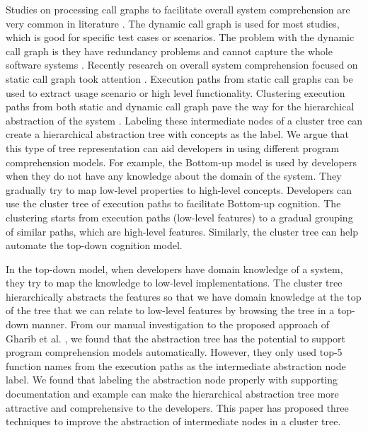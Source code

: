Studies on processing call graphs to facilitate overall system comprehension are very common in literature \cite{cornelissen2007understandingMassiveSequence, feng2018hierarchicalExecutionComprehension, reiss2005dynamicSoftwarePhases, watanabe2008featurePhaseDetection} . The dynamic call graph is used for most studies, which is good for specific test cases or scenarios. The problem with the dynamic call graph is they have redundancy problems and cannot capture the whole software systems \cite{gharibi2018automaticStaticCluster}. Recently research on overall system comprehension focused on static call graph took attention \cite{gharibi2018automaticStaticCluster, walunj2019graphevoEvolutionCall}. Execution paths from static call graphs \cite{pradel2009automaticUseageSpecification, salah2005scenariographerReverseEngineering} can be used to extract usage scenario or high level functionality. Clustering execution paths from both static and dynamic call graph pave the way for the hierarchical abstraction of the system \cite{feng2018hierarchicalExecutionComprehension, gharibi2018automaticStaticCluster}. Labeling these intermediate nodes of a cluster tree can create a hierarchical abstraction tree with concepts as the label. We argue that this type of tree representation can aid developers in using different program comprehension models. For example, the Bottom-up model is used by developers when they do not have any knowledge about the domain of the system. They gradually try to map low-level properties to high-level concepts. Developers can use the cluster tree of execution paths to facilitate Bottom-up cognition. The clustering starts from execution paths (low-level features) to a gradual grouping of similar paths, which are high-level features. Similarly, the cluster tree can help automate the top-down cognition model. 

In the top-down model, when developers have domain knowledge of a system, they try to map the knowledge to low-level implementations. The cluster tree hierarchically abstracts the features so that we have domain knowledge at the top of the tree that we can relate to low-level features by browsing the tree in a top-down manner. From our manual investigation to the proposed approach of Gharib et al. \cite{gharibi2018automaticStaticCluster}, we found that the abstraction tree has the potential to support program comprehension models automatically. However, they only used top-5 function names from the execution paths as the intermediate abstraction node label. We found that labeling the abstraction node properly with supporting documentation and example can make the hierarchical abstraction tree more attractive and comprehensive to the developers. This paper has proposed three techniques to improve the abstraction of intermediate nodes in a cluster tree. 

